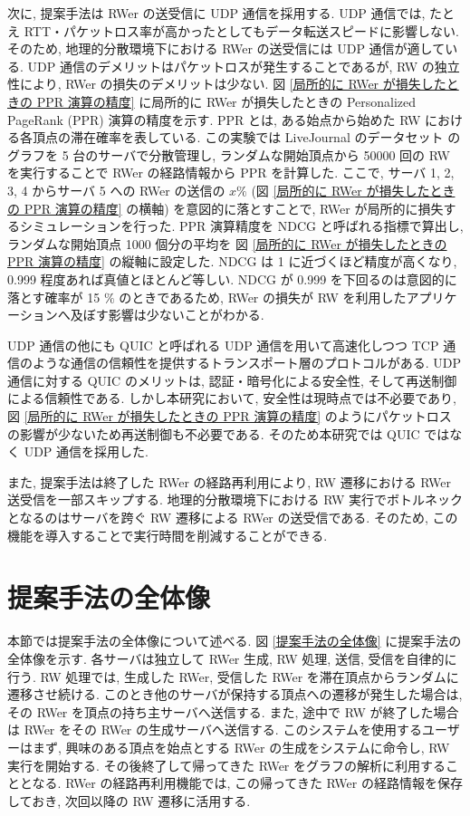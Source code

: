 次に, 提案手法は RWer の送受信に UDP 通信を採用する. UDP 通信では, たとえ RTT・パケットロス率が高かったとしてもデータ転送スピードに影響しない. そのため, 地理的分散環境下における RWer の送受信には UDP 通信が適している. UDP 通信のデメリットはパケットロスが発生することであるが, RW の独立性により, RWer の損失のデメリットは少ない. 図 \ref{局所的に RWer が損失したときの PPR 演算の精度} に局所的に RWer が損失したときの Personalized PageRank (PPR) 演算の精度を示す. PPR とは, ある始点から始めた RW における各頂点の滞在確率を表している. この実験では LiveJournal のデータセット\cite{snapnets} のグラフを 5 台のサーバで分散管理し, ランダムな開始頂点から 50000 回の RW を実行することで RWer の経路情報から PPR を計算した. ここで, サーバ 1, 2, 3, 4 からサーバ 5 への RWer の送信の $x\%$ (図 \ref{局所的に RWer が損失したときの PPR 演算の精度} の横軸) を意図的に落とすことで, RWer が局所的に損失するシミュレーションを行った. PPR 演算精度を NDCG と呼ばれる指標で算出し, ランダムな開始頂点 1000 個分の平均を 図 \ref{局所的に RWer が損失したときの PPR 演算の精度} の縦軸に設定した. NDCG は 1 に近づくほど精度が高くなり, 0.999 程度あれば真値とほとんど等しい. NDCG が 0.999 を下回るのは意図的に落とす確率が 15 $\%$ のときであるため, RWer の損失が RW を利用したアプリケーションへ及ぼす影響は少ないことがわかる. 

UDP 通信の他にも QUIC と呼ばれる UDP 通信を用いて高速化しつつ TCP 通信のような通信の信頼性を提供するトランスポート層のプロトコルがある. UDP 通信に対する QUIC のメリットは, 認証・暗号化による安全性, そして再送制御による信頼性である. しかし本研究において, 安全性は現時点では不必要であり, 図 \ref{局所的に RWer が損失したときの PPR 演算の精度} のようにパケットロスの影響が少ないため再送制御も不必要である. そのため本研究では QUIC ではなく UDP 通信を採用した. 

また, 提案手法は終了した RWer の経路再利用により, RW 遷移における RWer 送受信を一部スキップする. 地理的分散環境下における RW 実行でボトルネックとなるのはサーバを跨ぐ RW 遷移による RWer の送受信である. そのため, この機能を導入することで実行時間を削減することができる. 

\section{提案手法の全体像}\label{提案手法の全体像について}

本節では提案手法の全体像について述べる. 図 \ref{提案手法の全体像} に提案手法の全体像を示す. 各サーバは独立して RWer 生成, RW 処理, 送信, 受信を自律的に行う. RW 処理では, 生成した RWer, 受信した RWer を滞在頂点からランダムに遷移させ続ける. このとき他のサーバが保持する頂点への遷移が発生した場合は, その RWer を頂点の持ち主サーバへ送信する. また, 途中で RW が終了した場合は RWer をその RWer の生成サーバへ送信する. このシステムを使用するユーザーはまず, 興味のある頂点を始点とする RWer の生成をシステムに命令し, RW 実行を開始する. その後終了して帰ってきた RWer をグラフの解析に利用することとなる. RWer の経路再利用機能では, この帰ってきた RWer の経路情報を保存しておき, 次回以降の RW 遷移に活用する. 

